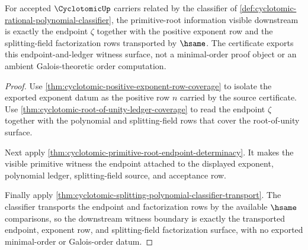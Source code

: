 \begin{theorem}
\label{thm:cyclotomic-primitive-order-witness-boundary}
For accepted $\CyclotomicUp$ carriers related by the classifier of \autoref{def:cyclotomic-rational-polynomial-classifier}, the primitive-root information visible downstream is exactly the endpoint $\zeta$ together with the positive exponent row and the splitting-field factorization rows transported by $\hsame$. The certificate exports this endpoint-and-ledger witness surface, not a minimal-order proof object or an ambient Galois-theoretic order computation.
\end{theorem}
\begin{proof}
Use \autoref{thm:cyclotomic-positive-exponent-row-coverage} to isolate the exported exponent datum as the positive row $n$ carried by the source certificate. Use \autoref{thm:cyclotomic-root-of-unity-ledger-coverage} to read the endpoint $\zeta$ together with the polynomial and splitting-field rows that cover the root-of-unity surface.

Next apply \autoref{thm:cyclotomic-primitive-root-endpoint-determinacy}. It makes the visible primitive witness the endpoint attached to the displayed exponent, polynomial ledger, splitting-field source, and acceptance row.

Finally apply \autoref{thm:cyclotomic-splitting-polynomial-classifier-transport}. The classifier transports the endpoint and factorization rows by the available $\hsame$ comparisons, so the downstream witness boundary is exactly the transported endpoint, exponent row, and splitting-field factorization surface, with no exported minimal-order or Galois-order datum.
\end{proof}

